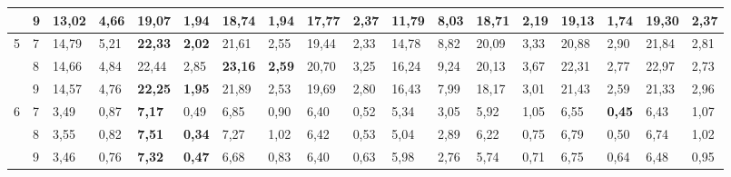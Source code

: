 \documentclass[conference]{IEEEtran}
\begin{document}
\begin{table}[]
\begin{tabular}{|cl|ll|ll|ll|ll|ll|ll|ll|ll|}
		\multicolumn{1}{|c|}{} & 9 & \multicolumn{1}{l|}{13,02} & 4,66 & \multicolumn{1}{l|}{19,07} & 1,94 & \multicolumn{1}{l|}{18,74} & 1,94 & \multicolumn{1}{l|}{17,77} & 2,37 & \multicolumn{1}{l|}{11,79} & 8,03 & \multicolumn{1}{l|}{18,71} & 2,19 & \multicolumn{1}{l|}{19,13} & \textbf{1,74} & \multicolumn{1}{l|}{\textbf{19,30}} & 2,37 \\ \hline
		\multicolumn{1}{|c|}{\multirow{3}{*}{5}} & 7 & \multicolumn{1}{l|}{14,79} & 5,21 & \multicolumn{1}{l|}{\textbf{22,33}} & \textbf{2,02} & \multicolumn{1}{l|}{21,61} & 2,55 & \multicolumn{1}{l|}{19,44} & 2,33 & \multicolumn{1}{l|}{14,78} & 8,82 & \multicolumn{1}{l|}{20,09} & 3,33 & \multicolumn{1}{l|}{20,88} & 2,90 & \multicolumn{1}{l|}{21,84} & 2,81 \\ \cline{2-18} 
		\multicolumn{1}{|c|}{} & 8 & \multicolumn{1}{l|}{14,66} & 4,84 & \multicolumn{1}{l|}{22,44} & 2,85 & \multicolumn{1}{l|}{\textbf{23,16}} & \textbf{2,59} & \multicolumn{1}{l|}{20,70} & 3,25 & \multicolumn{1}{l|}{16,24} & 9,24 & \multicolumn{1}{l|}{20,13} & 3,67 & \multicolumn{1}{l|}{22,31} & 2,77 & \multicolumn{1}{l|}{22,97} & 2,73 \\ \cline{2-18} 
		\multicolumn{1}{|c|}{} & 9 & \multicolumn{1}{l|}{14,57} & 4,76 & \multicolumn{1}{l|}{\textbf{22,25}} & \textbf{1,95} & \multicolumn{1}{l|}{21,89} & 2,53 & \multicolumn{1}{l|}{19,69} & 2,80 & \multicolumn{1}{l|}{16,43} & 7,99 & \multicolumn{1}{l|}{18,17} & 3,01 & \multicolumn{1}{l|}{21,43} & 2,59 & \multicolumn{1}{l|}{21,33} & 2,96 \\ \hline
		\multicolumn{1}{|c|}{\multirow{3}{*}{6}} & 7 & \multicolumn{1}{l|}{3,49} & 0,87 & \multicolumn{1}{l|}{\textbf{7,17}} & 0,49 & \multicolumn{1}{l|}{6,85} & 0,90 & \multicolumn{1}{l|}{6,40} & 0,52 & \multicolumn{1}{l|}{5,34} & 3,05 & \multicolumn{1}{l|}{5,92} & 1,05 & \multicolumn{1}{l|}{6,55} & \textbf{0,45} & \multicolumn{1}{l|}{6,43} & 1,07 \\ \cline{2-18} 
		\multicolumn{1}{|c|}{} & 8 & \multicolumn{1}{l|}{3,55} & 0,82 & \multicolumn{1}{l|}{\textbf{7,51}} & \textbf{0,34} & \multicolumn{1}{l|}{7,27} & 1,02 & \multicolumn{1}{l|}{6,42} & 0,53 & \multicolumn{1}{l|}{5,04} & 2,89 & \multicolumn{1}{l|}{6,22} & 0,75 & \multicolumn{1}{l|}{6,79} & 0,50 & \multicolumn{1}{l|}{6,74} & 1,02 \\ \cline{2-18} 
		\multicolumn{1}{|c|}{} & 9 & \multicolumn{1}{l|}{3,46} & 0,76 & \multicolumn{1}{l|}{\textbf{7,32}} & \textbf{0,47} & \multicolumn{1}{l|}{6,68} & 0,83 & \multicolumn{1}{l|}{6,40} & 0,63 & \multicolumn{1}{l|}{5,98} & 2,76 & \multicolumn{1}{l|}{5,74} & 0,71 & \multicolumn{1}{l|}{6,75} & 0,64 & \multicolumn{1}{l|}{6,48} & 0,95 \\ \hline

\end{tabular}
\end{table}
\end{document}
